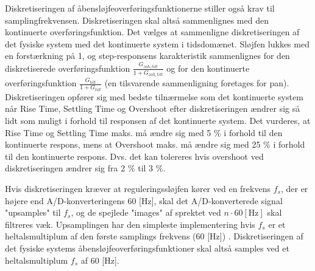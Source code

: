 Diskretiseringen af åbensløjfeoverføringsfunktionerne stiller også krav til samplingfrekvensen.
Diskretiseringen skal altså sammenlignes med den kontinuerte overføringsfunktion.
Det vælges at sammenligne diskretiseringen af det fysiske system med det kontinuerte system i tidsdomænet.
Sløjfen lukkes med en forstærkning på 1, og step-responsens karakteristik sammenlignes
for den diskretiserede overføringsfunktion \(\frac{G_{zoh,tilt}}{1+G_{zoh,tilt}}\)
og for den kontinuerte overføringsfunktion \(\frac{G_{tilt}}{1+G_{tilt}}\) (en tilsvarende sammenligning foretages for pan).
Diskretiseringen opfører sig med bedste tilnærmelse som det kontinuerte system
når Rise Time, Settling Time og Overshoot efter diskretiseringen
ændrer sig så lidt som muligt i forhold til responsen af det kontinuerte system.
Det vurderes, at Rise Time og Settling Time maks. må ændre sig med 5 \% i forhold
til den kontinuerte respons, mens at Overshoot maks. må ændre sig med 25 \% i forhold til
den kontinuerte respons.
Dvs. det kan tolereres hvis overshoot
ved diskretiseringen ændrer sig fra 2 \% til 3 \%.

Hvis diskretiseringen kræver at reguleringssløjfen kører ved en frekvens \(f_s\),
der er højere end A/D-konverteringens 60 [Hz], skal det A/D-konverterede
signal "upsamples" til \(f_s\), og de spejlede "images" af sprektet ved \(n\cdot{}60 \mathrm{\left[Hz\right]}\) skal filtreres væk.
Upsamplingen har den simpleste implementering
hvis \(f_s\) er et heltalsmultiplum af den første samplings frekvens (60 [Hz]) \citep{dsp}.
Diskretiseringen af det fysiske systems åbensløjfeoverføringsfunktioner skal altså samples ved et heltalsmultiplum \(f_s\) af 60 [Hz].

